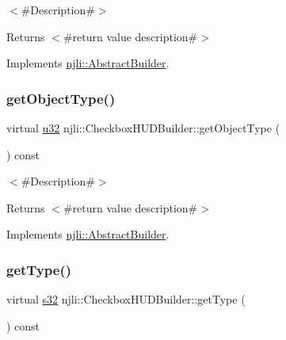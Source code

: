 $<$\#\+Description\#$>$

\begin{DoxyReturn}{Returns}
$<$\#return value description\#$>$ 
\end{DoxyReturn}


Implements \mbox{\hyperlink{classnjli_1_1_abstract_builder_a902f73ea78031b06aca183a417f3413b}{njli\+::\+Abstract\+Builder}}.

\mbox{\label{classnjli_1_1_checkbox_h_u_d_builder_a59a91bc952633352233bb3f05c979a30}} 
\subsubsection{\texorpdfstring{get\+Object\+Type()}{getObjectType()}}
{\footnotesize\ttfamily virtual \mbox{\hyperlink{_util_8h_a10e94b422ef0c20dcdec20d31a1f5049}{u32}} njli\+::\+Checkbox\+H\+U\+D\+Builder\+::get\+Object\+Type (\begin{DoxyParamCaption}{ }\end{DoxyParamCaption}) const\hspace{0.3cm}{\ttfamily [virtual]}}

$<$\#\+Description\#$>$

\begin{DoxyReturn}{Returns}
$<$\#return value description\#$>$ 
\end{DoxyReturn}


Implements \mbox{\hyperlink{classnjli_1_1_abstract_builder_a0f2d344fcf697b167f4f2b1122b5fb33}{njli\+::\+Abstract\+Builder}}.

\mbox{\label{classnjli_1_1_checkbox_h_u_d_builder_a38780724b9af21a3a8ba68baec494e57}} 
\subsubsection{\texorpdfstring{get\+Type()}{getType()}}
{\footnotesize\ttfamily virtual \mbox{\hyperlink{_util_8h_aa62c75d314a0d1f37f79c4b73b2292e2}{s32}} njli\+::\+Checkbox\+H\+U\+D\+Builder\+::get\+Type (\begin{DoxyParamCaption}{ }\end{DoxyParamCaption}) const\hspace{0.3cm}{\ttfamily [virtual]}}

